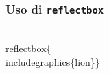 \documentclass[svgnames,%
	ucs,%
	pdftex]{guitbeamer}
\begin{document}
\begin{frame}
  \frametitle{Uso di \texttt{reflectbox}}
	\begin{LaTeXcode}
		\\reflectbox\{\\includegraphics\{lion\}\}
	\end{LaTeXcode}
	\begin{center}
	\end{center}
\end{frame}
\end{document}
